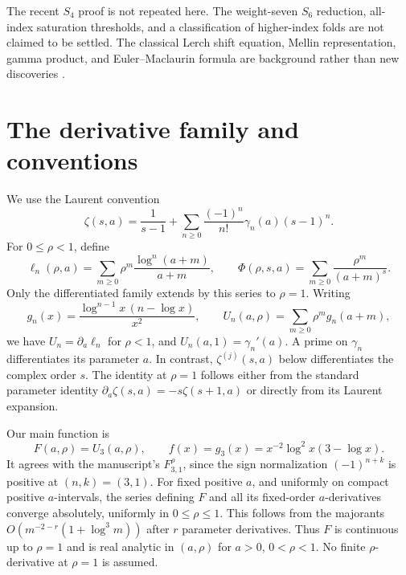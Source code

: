\documentclass[11pt]{article}
\numberwithin{equation}{section}
\theoremstyle{definition}
\begin{document}
The recent $S_4$ proof is not repeated here. The weight-seven $S_6$ reduction,
all-index saturation thresholds, and a classification of higher-index folds
are not claimed to be settled. The classical Lerch shift equation, Mellin
representation, gamma product, and Euler--Maclaurin formula are background
rather than new discoveries \cite{dlmf-lerch,dlmf-hurwitz,dlmf-gamma,dlmf-em,coffey}.

\section{The derivative family and conventions}
\label{sec:family}
We use the Laurent convention
\begin{equation}
 \zeta(s,a)=\frac1{s-1}+\sum_{n\geq0}\frac{(-1)^n}{n!}\gamma_n(a)(s-1)^n.
\end{equation}
For $0\leq\rho<1$, define
\[
 \ell_n(\rho,a)=\sum_{m\geq0}\rho^m\frac{\log^n(a+m)}{a+m},
 \qquad
 \Phi(\rho,s,a)=\sum_{m\geq0}\frac{\rho^m}{(a+m)^s}.
\]
Only the differentiated family extends by this series to $\rho=1$.
Writing
\begin{equation}\label{eq:gn}
 g_n(x)=\frac{\log^{n-1}x\,(n-\log x)}{x^2},\qquad
 U_n(a,\rho)=\sum_{m\geq0}\rho^m g_n(a+m),
\end{equation}
we have $U_n=\partial_a\ell_n$ for $\rho<1$, and
$U_n(a,1)=\gamma_n'(a)$. A prime on $\gamma_n$ differentiates its parameter
$a$. In contrast, $\zeta^{(j)}(s,a)$ below differentiates the complex order $s$.
The identity at $\rho=1$ follows either from the standard parameter identity
$\partial_a\zeta(s,a)=-s\zeta(s+1,a)$ or directly from its Laurent expansion.

Our main function is
\begin{equation}\label{eq:Fdef}
 F(a,\rho)=U_3(a,\rho),\qquad
 f(x)=g_3(x)=x^{-2}\log^2x(3-\log x).
\end{equation}
It agrees with the manuscript's $F_{3,1}^{\rho}$, since the sign normalization
$(-1)^{n+k}$ is positive at $(n,k)=(3,1)$.
For fixed positive $a$, and uniformly on compact positive $a$-intervals,
the series defining $F$ and all its fixed-order $a$-derivatives converge
absolutely, uniformly in $0\leq\rho\leq1$. This follows from the majorants
$O(m^{-2-r}(1+\log^3m))$ after $r$ parameter derivatives.
Thus $F$ is continuous up to $\rho=1$ and is real analytic in $(a,\rho)$ for
$a>0$, $0<\rho<1$. No finite $\rho$-derivative at $\rho=1$ is assumed.
\end{document}
